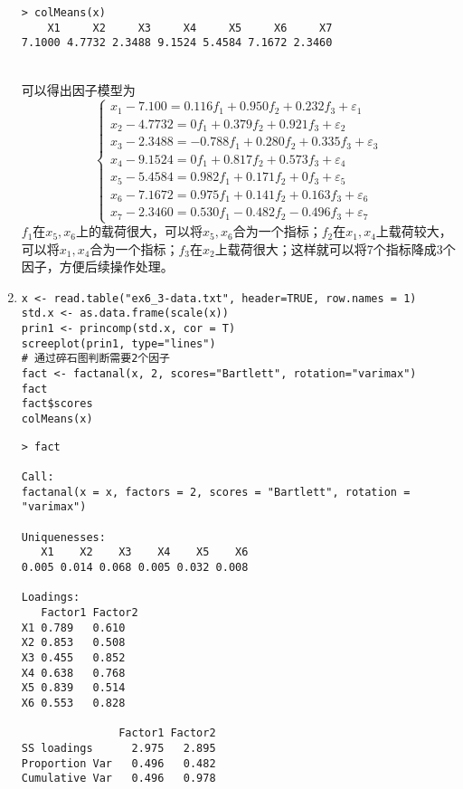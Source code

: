 \begin{enumerate}
\begin{lstlisting}
> colMeans(x)
    X1     X2     X3     X4     X5     X6     X7 
7.1000 4.7732 2.3488 9.1524 5.4584 7.1672 2.3460
\end{lstlisting}
        \summary\\
        可以得出因子模型为\[\begin{cases}
            x_1 - 7.100 = 0.116f_1 + 0.950f_2 + 0.232f_3 + \varepsilon_1\\
            x_2 - 4.7732 = 0f_1 + 0.379f_2 + 0.921f_3 + \varepsilon_2\\
            x_3 - 2.3488 = -0.788f_1 + 0.280f_2 + 0.335f_3 + \varepsilon_3\\
            x_4 - 9.1524 = 0f_1 + 0.817f_2 + 0.573f_3 + \varepsilon_4\\
            x_5 - 5.4584 = 0.982f_1 + 0.171f_2 + 0f_3 + \varepsilon_5\\
            x_6 - 7.1672 = 0.975f_1 + 0.141f_2 + 0.163f_3 + \varepsilon_6\\
            x_7 - 2.3460 = 0.530f_1 - 0.482f_2 - 0.496f_3 + \varepsilon_7
            \end{cases}\]
        $f_1$在$x_5,x_6$上的载荷很大，可以将$x_5,x_6$合为一个指标；$f_2$在$x_1,x_4$上载荷较大，可以将$x_1,x_4$合为一个指标；$f_3$在$x_2$上载荷很大；这样就可以将7个指标降成3个因子，方便后续操作处理。
        \item
        \code
\begin{lstlisting}
x <- read.table("ex6_3-data.txt", header=TRUE, row.names = 1)
std.x <- as.data.frame(scale(x))
prin1 <- princomp(std.x, cor = T)
screeplot(prin1, type="lines")
# 通过碎石图判断需要2个因子
fact <- factanal(x, 2, scores="Bartlett", rotation="varimax")
fact
fact$scores
colMeans(x)
\end{lstlisting}
        \out
\begin{lstlisting}
> fact

Call:
factanal(x = x, factors = 2, scores = "Bartlett", rotation = "varimax")

Uniquenesses:
   X1    X2    X3    X4    X5    X6 
0.005 0.014 0.068 0.005 0.032 0.008 

Loadings:
   Factor1 Factor2
X1 0.789   0.610  
X2 0.853   0.508  
X3 0.455   0.852  
X4 0.638   0.768  
X5 0.839   0.514  
X6 0.553   0.828  

               Factor1 Factor2
SS loadings      2.975   2.895
Proportion Var   0.496   0.482
Cumulative Var   0.496   0.978


\end{lstlisting}
\end{enumerate}
